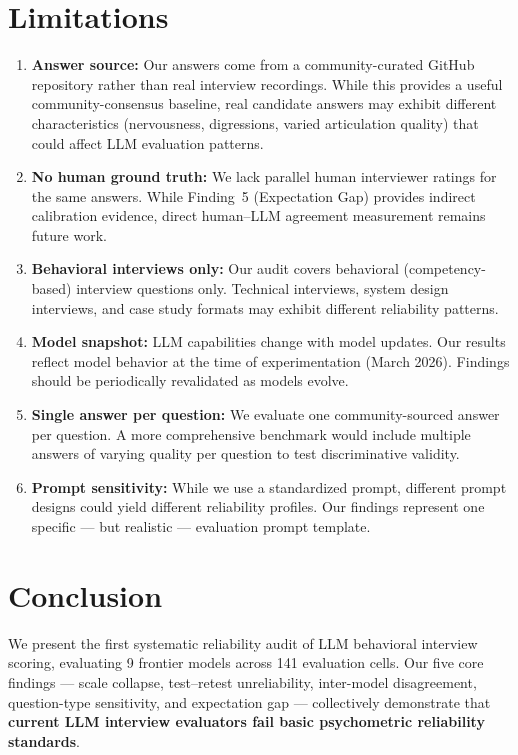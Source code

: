 \documentclass{article}
\begin{document}
\section{Limitations}\label{sec:limitations}
\begin{enumerate}
  \item \textbf{Answer source:} Our answers come from a community-curated GitHub repository rather than real interview recordings. While this provides a useful community-consensus baseline, real candidate answers may exhibit different characteristics (nervousness, digressions, varied articulation quality) that could affect LLM evaluation patterns.
  \item \textbf{No human ground truth:} We lack parallel human interviewer ratings for the same answers. While Finding~5 (Expectation Gap) provides indirect calibration evidence, direct human--LLM agreement measurement remains future work.
  \item \textbf{Behavioral interviews only:} Our audit covers behavioral (competency-based) interview questions only. Technical interviews, system design interviews, and case study formats may exhibit different reliability patterns.
  \item \textbf{Model snapshot:} LLM capabilities change with model updates. Our results reflect model behavior at the time of experimentation (March 2026). Findings should be periodically revalidated as models evolve.
  \item \textbf{Single answer per question:} We evaluate one community-sourced answer per question. A more comprehensive benchmark would include multiple answers of varying quality per question to test discriminative validity.
  \item \textbf{Prompt sensitivity:} While we use a standardized prompt, different prompt designs could yield different reliability profiles. Our findings represent one specific --- but realistic --- evaluation prompt template.
\end{enumerate}

\section{Conclusion}\label{sec:conclusion}

We present the first systematic reliability audit of LLM behavioral interview scoring, evaluating 9 frontier models across 141 evaluation cells. Our five core findings --- scale collapse, test--retest unreliability, inter-model disagreement, question-type sensitivity, and expectation gap --- collectively demonstrate that \textbf{current LLM interview evaluators fail basic psychometric reliability standards}.
\end{document}
